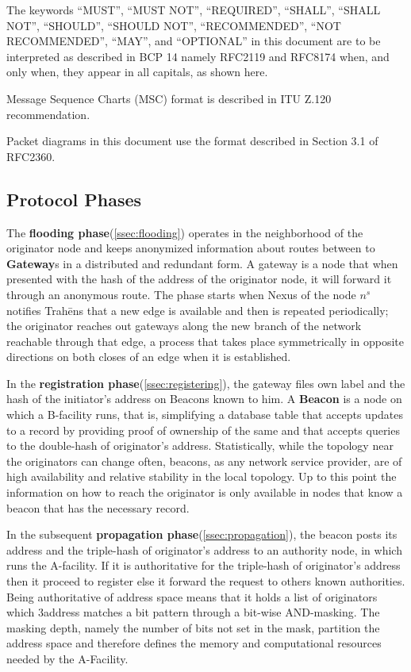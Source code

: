 \documentclass[12pt,oneside]{wlscirep}
\newcommand{\ProtoName}{Trah\={e}ns }
\begin{document}
The keywords “MUST”, “MUST NOT”, “REQUIRED”, “SHALL”, “SHALL NOT”, “SHOULD”, “SHOULD NOT”, “RECOMMENDED”, “NOT RECOMMENDED”, “MAY”, and “OPTIONAL” in this document are to be interpreted as described in BCP 14 namely RFC2119\cite{RFC2119} and RFC8174\cite{RFC8174} when, and only when, they appear in all capitals, as shown here.\par
Message Sequence Charts (MSC) format is described in ITU Z.120\cite{noauthor_z.120_2011} recommendation. \par 
Packet diagrams in this document use the format described in Section 3.1 of RFC2360\cite{RFC2360}.\par

\subsection{Protocol Phases}
The \textbf{flooding phase}(\ref{ssec:flooding}) operates in the neighborhood of the originator node and keeps anonymized information about routes between to \textbf{Gateway}s in a distributed and redundant form. A gateway is a node that when presented with the hash of the address of the originator node, it will forward it through an anonymous route. The phase starts when Nexus of the node $n^s$ notifies \ProtoName that a new edge is available and then is repeated periodically; the originator reaches out gateways along the new branch of the network reachable through that edge, a process that takes place symmetrically in opposite directions on both closes of an edge when it is established. \par
In the \textbf{registration phase}(\ref{ssec:registering}), the gateway files own label and the hash of the initiator's address on Beacons known to him. A \textbf{Beacon} is a node on which a B-facility runs, that is, simplifying a database table that accepts updates to a record by providing proof of ownership of the same and that accepts queries to the double-hash of originator's address. Statistically, while the topology near the originators can change often, beacons, as any network service provider, are of high availability and relative stability in the local topology. Up to this point the information on how to reach the originator is only available in nodes that know a beacon that has the necessary record. \par
In the subsequent \textbf{propagation phase}(\ref{ssec:propagation}), the beacon posts its address and the triple-hash of originator's address to an authority node, in which runs the A-facility. If it is authoritative for the triple-hash of originator's address then it proceed to register else it forward the request to others known authorities. Being authoritative of address space means that it holds a list of originators which 3address matches a bit pattern through a bit-wise AND-masking. The masking depth, namely the number of bits not set in the mask, partition the address space  and therefore defines the memory and computational resources needed by the A-Facility.\par
\end{document}
